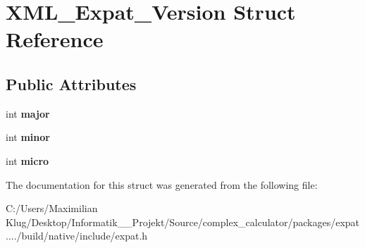 \hypertarget{struct_x_m_l___expat___version}{}\section{X\+M\+L\+\_\+\+Expat\+\_\+\+Version Struct Reference}
\label{struct_x_m_l___expat___version}
\subsection*{Public Attributes}
\begin{DoxyCompactItemize}
\item 
\mbox{\label{struct_x_m_l___expat___version_a0c16da8d497c8eefd86a1bb4c6ea23b5}} 
int {\bfseries major}
\item 
\mbox{\label{struct_x_m_l___expat___version_ab9b1e025090b5f4e7c8f206c72aeb8b6}} 
int {\bfseries minor}
\item 
\mbox{\label{struct_x_m_l___expat___version_ac6b159560f37010366faaf9531f74929}} 
int {\bfseries micro}
\end{DoxyCompactItemize}


The documentation for this struct was generated from the following file\+:\begin{DoxyCompactItemize}
\item 
C\+:/\+Users/\+Maximilian Klug/\+Desktop/\+Informatik\+\_\+\_\+\+Projekt/\+Source/complex\+\_\+calculator/packages/expat..../build/native/include/expat.\+h\end{DoxyCompactItemize}
